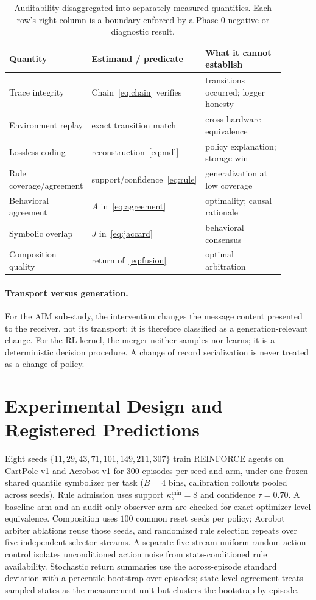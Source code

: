 \documentclass[11pt]{article}
\begin{document}
\begin{table}[t]
\centering\small
\begin{tabular}{@{}p{0.26\linewidth}p{0.30\linewidth}p{0.34\linewidth}@{}}
\toprule
Quantity & Estimand / predicate & What it cannot establish \\
\midrule
Trace integrity & Chain~\eqref{eq:chain} verifies & transitions occurred; logger honesty \\
Environment replay & exact transition match & cross-hardware equivalence \\
Lossless coding & reconstruction~\eqref{eq:mdl} & policy explanation; storage win \\
Rule coverage/agreement & support/confidence~\eqref{eq:rule} & generalization at low coverage \\
Behavioral agreement & $A$ in~\eqref{eq:agreement} & optimality; causal rationale \\
Symbolic overlap & $J$ in~\eqref{eq:jaccard} & behavioral consensus \\
Composition quality & return of~\eqref{eq:fusion} & optimal arbitration \\
\bottomrule
\end{tabular}
\caption{Auditability disaggregated into separately measured quantities. Each row's right column is
a boundary enforced by a Phase-0 negative or diagnostic result.}
\label{tab:taxonomy}
\end{table}

\paragraph{Transport versus generation.}
For the AIM sub-study, the intervention changes the message content presented to the receiver, not
its transport; it is therefore classified as a generation-relevant change. For the RL kernel, the
merger neither samples nor learns; it is a deterministic decision procedure. A change of record
serialization is never treated as a change of policy.

\section{Experimental Design and Registered Predictions}
\label{sec:design}

Eight seeds $\{11,29,43,71,101,149,211,307\}$ train REINFORCE agents on CartPole-v1 and
Acrobot-v1 for $300$ episodes per seed and arm, under one frozen shared quantile symbolizer per
task ($B=4$ bins, calibration rollouts pooled across seeds). Rule admission uses support
$\kappa_s^{\min}=8$ and confidence $\tau=0.70$. A baseline arm and an audit-only observer arm are
checked for exact optimizer-level equivalence. Composition uses $100$ common reset seeds per
policy; Acrobot arbiter ablations reuse those seeds, and randomized rule selection repeats over
five independent selector streams. A separate five-stream uniform-random-action control isolates
unconditioned action noise from state-conditioned rule availability. Stochastic return summaries
use the across-episode standard deviation with a percentile bootstrap over episodes; state-level
agreement treats sampled states as the measurement unit but clusters the bootstrap by episode.
\end{document}
